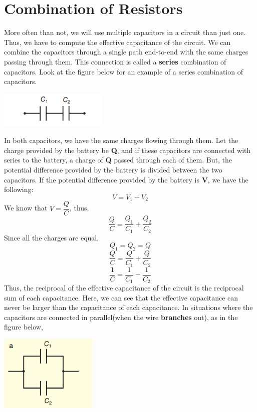\documentclass[9pt]{exam}
\begin{document}
	\section*{Combination of Resistors}
	More often than not, we will use multiple capacitors in a circuit than just one. Thus, we have to compute the effective capacitance of the circuit.\newline
	We can combine the capacitors through a single path end-to-end with the same charges passing through them. This connection is called a \textbf{series} combination of capacitors. Look at the figure below for an example of a series combination of capacitors. \\
	\begin{center}
		\includegraphics[scale=1]{series_capacitors.png}	
	\end{center}
	In both capacitors, we have the same charges flowing through them. Let the charge provided by the battery be \textbf{Q}, and if these capacitors are connected with series to the battery, a charge of \textbf{Q} passed through each of them. But, the potential difference provided by the battery is divided between the two capacitors. If the potential difference provided by the battery is \textbf{V}, we have the following: \newline
	$$V = V_1 + V_2$$
	We know that $V=\dfrac{Q}{C}$, thus,
	$$\dfrac{Q}{C} = \frac{Q_1}{C_1} + \frac{Q_2}{C_2}$$
	Since all the charges are equal,
	$$Q_1=Q_2=Q$$
	$$\frac{Q}{C} = \frac{Q}{C_1} + \frac{Q}{C_2}$$
	$$\frac{1}{C} = \frac{1}{C_1} + \frac{1}{C_2}$$    
	Thus, the reciprocal of the effective capacitance of the circuit is the reciprocal sum of each capacitance. Here, we can see that the effective capacitance can never be larger than the capacitance of each capacitance.
	In situations where the capacitors are connected in parallel(when the wire \textbf{branches} out), as in the figure below,\\
	\begin{center}
		\includegraphics[scale=1]{parallel_capacitors.png}	
	\end{center}
\end{document}
